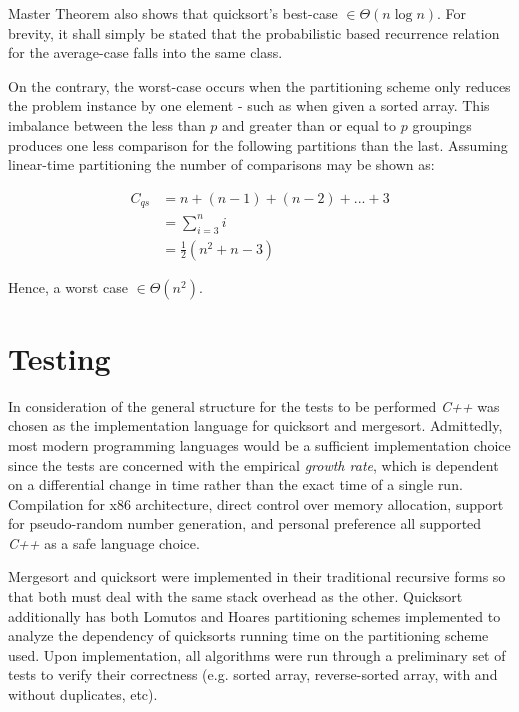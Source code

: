\documentclass[11pt,letterpaper]{report}
\begin{document}
Master Theorem also shows that quicksort's best-case $\in \Theta(n\log{}n)$. For brevity, it shall simply be stated that the probabilistic based recurrence relation for the average-case falls into the same class.

On the contrary, the worst-case occurs when the partitioning scheme only reduces the problem instance by one element - such as when given a sorted array. This imbalance between the less than $p$ and greater than or equal to $p$ groupings produces one less comparison for the following partitions than the last. Assuming linear-time partitioning the number of comparisons may be shown as:

\begin{equation} \label{eq1}
\begin{split}
C_{qs} 	     & =n+(n-1)+(n-2)+...+3 \\
                      & = \sum_{i=3}^{n}i \\
                      & = \frac{1}{2}(n^2+n-3)
\end{split}
\end{equation}


Hence, a worst case $\in \Theta(n^2)$.

\section*{Testing}
In consideration of the general structure for the tests to be performed \emph{C++} was chosen as the implementation language for quicksort and mergesort. Admittedly, most modern programming languages would be a sufficient implementation choice since the tests are concerned with the empirical \emph{growth rate}, which is dependent on a differential change in time rather than the exact time of a single run. Compilation for x86 architecture, direct control over memory allocation, support for pseudo-random number generation, and personal preference all supported \emph{C++} as a safe language choice.

Mergesort and quicksort were implemented in their traditional recursive forms so that both must deal with the same stack overhead as the other. Quicksort additionally has both Lomutos and Hoares partitioning schemes implemented to analyze the dependency of quicksorts running time on the partitioning scheme used. Upon implementation, all algorithms were run through a preliminary set of tests to verify their correctness (e.g. sorted array, reverse-sorted array, with and without duplicates, etc).
\end{document}
